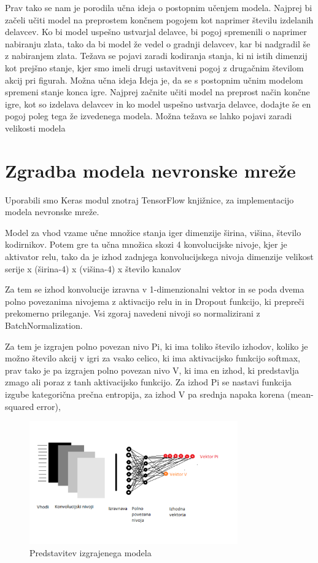 \documentclass[a4paper, 12pt]{book}
\begin{document}
Prav tako se nam je porodila učna ideja o postopnim učenjem modela. Najprej bi začeli učiti model na preprostem končnem pogojem kot naprimer številu izdelanih delavcev. Ko bi model uspešno ustvarjal delavce, bi pogoj spremenili o naprimer nabiranju zlata, tako da bi model že vedel o gradnji delavcev, kar bi nadgradil še z nabiranjem zlata. Težava se pojavi zaradi kodiranja stanja, ki ni istih dimenzij kot prejšno stanje, kjer smo imeli drugi ustavitveni pogoj z drugačnim številom akcij pri figurah.
Možna učna ideja
Ideja je, da se s postopnim učnim modelom spremeni stanje konca igre. Najprej začnite učiti model na preprost način končne igre, kot so izdelava delavcev in ko model uspešno ustvarja delavce, dodajte še en pogoj poleg tega že izvedenega modela.
Možna težava se lahko pojavi zaradi velikosti modela

\section{Zgradba modela nevronske mreže}

Uporabili smo Keras modul znotraj TensorFlow knjižnice, za implementacijo modela nevronske mreže.

Model za vhod vzame učne množice stanja iger dimenzije širina, višina, število kodirnikov.
Potem gre ta učna množica skozi 4 konvolucijske nivoje, kjer je aktivator relu, tako da je izhod zadnjega konvolucijskega nivoja dimenzije velikost serije  x (širina-4) x (višina-4) x število kanalov

Za tem se izhod konvolucije izravna v 1-dimenzionalni vektor in se poda dvema polno povezanima nivojema z aktivacijo relu in in Dropout funkcijo, ki prepreči prekomerno prileganje.
Vsi zgoraj navedeni nivoji so normalizirani z BatchNormalization.

Za tem je izgrajen polno povezan nivo Pi, ki ima toliko število izhodov, koliko je možno število akcij v igri za vsako celico, ki ima aktivacijsko funkcijo softmax,
prav tako je pa izgrajen polno povezan nivo V, ki ima en izhod, ki predstavlja zmago ali poraz z tanh aktivacijsko funkcijo.
Za izhod Pi se nastavi funkcija izgube kategorična prečna entropija, za izhod V pa srednja napaka korena (mean-squared error),


\begin{figure}[h]
	\begin{center}
		\includegraphics[width=0.8\textwidth]{vizualzacijaModela.pdf}
	\end{center}
	\caption{Predstavitev izgrajenega modela}
	\label{vizualzacijaModela}
\end{figure}
\end{document}
